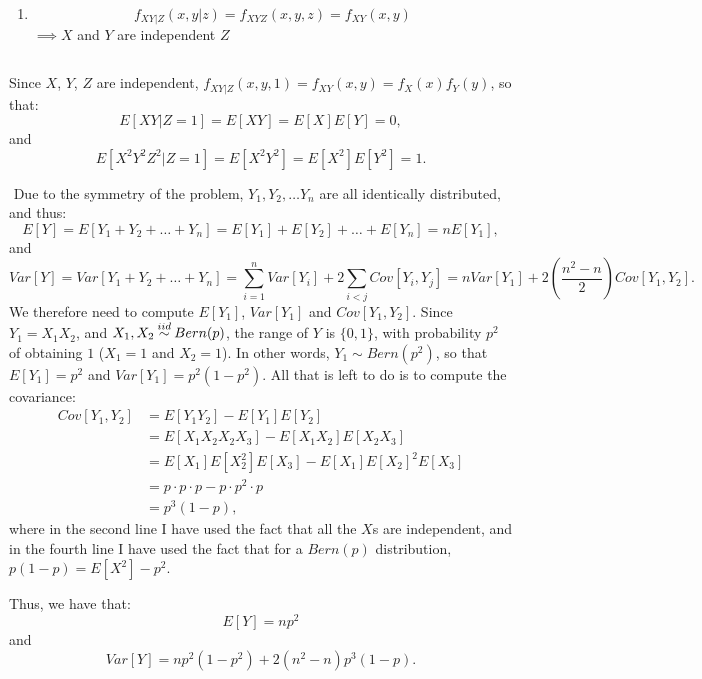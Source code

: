 \begin{problem}{1}
\begin{enumerate}
\item

\begin{equation*}
f_{XY|Z}(x, y|z) = f_{XYZ}(x, y, z) = f_{XY}(x, y)
\end{equation*}
$\implies X$ and $Y$ are independent $Z$
\end{enumerate}

\end{problem}

\begin{problem}{2} $ $

Since $X$, $Y$, $Z$ are independent, $f_{XY|Z}(x, y, 1) = f_{XY}(x, y) = f_X(x)f_Y(y)$, so that:
\begin{equation*}
E[XY|Z=1] = E[XY] = E[X]E[Y] = 0,
\end{equation*}
and
\begin{equation*}
E[X^2Y^2Z^2|Z=1] = E[X^2Y^2] = E[X^2]E[Y^2] = 1.
\end{equation*}

\end{problem}



\begin{problem}{4} $ $
Due to the symmetry of the problem, $Y_1, Y_2, \ldots Y_n$ are all identically distributed, and thus:
\begin{equation*}
E[Y] = E[Y_1+Y_2+\ldots +Y_n] = E[Y_1]+E[Y_2]+\ldots +E[Y_n]  = nE[Y_1],
\end{equation*}
and
\begin{equation*}
Var[Y] = Var[Y_1+Y_2+\ldots +Y_n] = \sum_{i=1}^n Var [Y_i]+2 \sum_{i<j} Cov[Y_i, Y_j]  = nVar[Y_1]+2 \left (\frac{n^2-n}{2} \right)Cov[Y_1, Y_2].
\end{equation*}
We therefore need to compute $E[Y_1]$, $Var[Y_1]$ and $Cov[Y_1, Y_2]$.  Since $Y_1 = X_1X_2$, and $X_1, X_2 \distas{iid} Bern(p)$, the range of $Y$ is $\{0, 1 \}$, with probability $p^2$ of obtaining $1$ ($X_1 =1$ and $X_2 = 1$).  In other words, $Y_1\sim Bern(p^2)$, so that $E[Y_1] = p^2$ and $Var[Y_1] = p^2 (1-p^2)$.  All that is left to do is to compute the covariance:
\begin{align*}
Cov[Y_1, Y_2] &= E[Y_1Y_2]-E[Y_1]E[Y_2] \\
&= E[X_1X_2 X_2X_3]-E[X_1X_2]E[X_2X_3] \\
& = E[X_1]E[X_2^2]E[X_3]-E[X_1]E[X_2]^2E[X_3] \\
& = p\cdot p \cdot p - p\cdot p^2 \cdot p \\
& = p^3(1-p),
\end{align*}
where in the second line I have used the fact that all the $X$s are independent, and in the fourth line I have used the fact that for a $Bern(p)$ distribution, $p(1-p) = E[X^2] - p^2$. 

Thus, we have that:
\begin{equation*}
E[Y]  = np^2
\end{equation*}
and
\begin{equation*}
Var[Y] = np^2 (1-p^2)+2 (n^2-n) p^3(1-p).
\end{equation*}


\end{problem}


